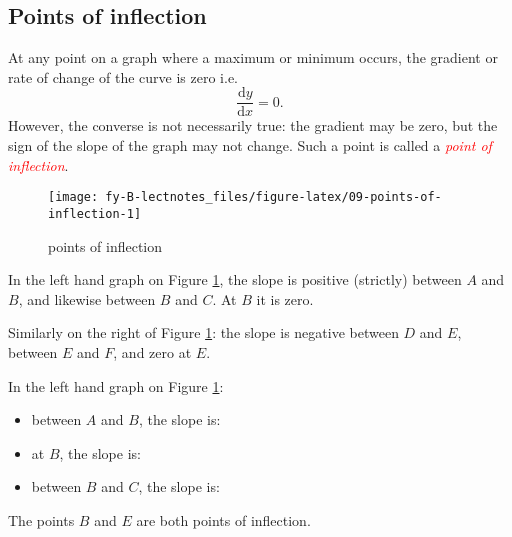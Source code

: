 \documentclass[
  11pt,
  oneside]{book}
\providecommand{\tightlist}{%
  \setlength{\itemsep}{0pt}\setlength{\parskip}{0pt}}
\newcommand{\slide}{}
\theoremstyle{definition}
\theoremstyle{definition}
\theoremstyle{definition}
\theoremstyle{definition}
\theoremstyle{remark}
\begin{document}
\subsection{Points of inflection}\label{points-of-inflection}

At any point on a graph where a maximum or minimum occurs, the gradient or rate of change of the curve is zero i.e.
\[
\frac{\mathrm{d} y}{\mathrm{d} x}=0.
\]
However, the converse is not necessarily true: the gradient may be zero, but the sign of the slope of the graph may not change. Such a point is called a \textcolor{red}{\em point of inflection}.

\slide

\begin{figure}

{\centering \texttt{[image: fy-B-lectnotes\_files/figure-latex/09-points-of-inflection-1]} 

}

\caption{points of inflection}\label{fig:09-points-of-inflection}
\end{figure}

\begin{notslides}

In the left hand graph on Figure \ref{fig:09-points-of-inflection}, the slope is positive (strictly) between \(A\) and \(B\), and likewise between \(B\) and \(C\). At \(B\) it is zero.

Similarly on the right of Figure \ref{fig:09-points-of-inflection}:
the slope is negative between \(D\) and \(E\), between \(E\) and \(F\), and zero at \(E\).

\end{notslides}

\begin{slidesonly}

In the left hand graph on Figure \ref{fig:09-points-of-inflection}:

\begin{itemize}
\tightlist
\item
  between \(A\) and \(B\), the slope is:
\item
  at \(B\), the slope is:
\item
  between \(B\) and \(C\), the slope is:
\end{itemize}

\end{slidesonly}

The points \(B\) and \(E\) are both points of inflection.
\end{document}
